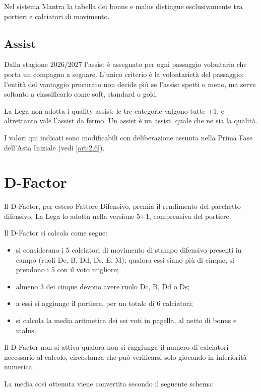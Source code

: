 Nel sistema Mantra la tabella dei bonus e malus distingue esclusivamente tra portieri e calciatori di movimento.

\subsection{Assist}
\label{art:5.3.1}

Dalla stagione 2026/2027 l'assist è assegnato per ogni passaggio volontario che porta un compagno a segnare. L'unico criterio è la volontarietà del passaggio: l'entità del vantaggio procurato non decide più se l'assist spetti o meno, ma serve soltanto a classificarlo come soft, standard o gold.

La Lega non adotta i quality assist: le tre categorie valgono tutte +1, e altrettanto vale l'assist da fermo. Un assist è un assist, quale che ne sia la qualità.

I valori qui indicati sono modificabili con deliberazione assunta nella Prima Fase dell'Asta Iniziale (vedi \ref{art:2.6}).

\section{D-Factor}
\label{art:5.4}

Il D-Factor, per esteso Fattore Difensivo, premia il rendimento del pacchetto difensivo. La Lega lo adotta nella versione 5+1, comprensiva del portiere.

Il D-Factor si calcola come segue:

\begin{itemize}
\item si considerano i 5 calciatori di movimento di stampo difensivo presenti in campo (ruoli Dc, B, Dd, Ds, E, M); qualora essi siano più di cinque, si prendono i 5 con il voto migliore;
\item almeno 3 dei cinque devono avere ruolo Dc, B, Dd o Ds;
\item a essi si aggiunge il portiere, per un totale di 6 calciatori;
\item si calcola la media aritmetica dei sei voti in pagella, al netto di bonus e malus.
\end{itemize}

Il D-Factor non si attiva qualora non si raggiunga il numero di calciatori necessario al calcolo, circostanza che può verificarsi solo giocando in inferiorità numerica.

La media così ottenuta viene convertita secondo il seguente schema:

